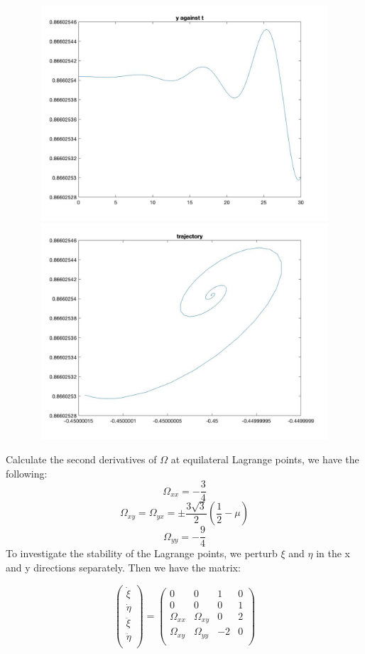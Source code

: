 \documentclass[11pt]{article}
\begin{document}
\begin{figure}[H]
\includegraphics[width = 12cm, height = 8cm]{Q5(26).jpg}\\\includegraphics[width = 12cm, height = 8cm]{Q5(27).jpg}
\end{figure}
\newpage

Calculate the second derivatives of $\Omega$ at equilateral Lagrange points, we have the following: $$\Omega_{xx} = -\frac{3}{4}$$
$$\Omega_{xy} = \Omega_{yx} = \pm \frac{3\sqrt{3}}{2}(\frac{1}{2}-\mu)$$
$$\Omega_{yy} = -\frac{9}{4}$$
To investigate the stability of the Lagrange points, we perturb $\xi$ and $\eta$ in the x and y directions separately. Then we have the matrix: 

\[
\begin{pmatrix}
\dot {\xi} \\
\dot {\eta} \\
\ddot{\xi} \\
\ddot{\eta} \\
\end{pmatrix} 
=
\begin{pmatrix}
0 & 0 & 1 & 0\\
0 & 0 & 0 & 1\\
\Omega_{xx} & \Omega_{xy} & 0 & 2\\
\Omega_{xy} & \Omega_{yy}  & -2 & 0\\
\end{pmatrix}
\]
\end{document}
